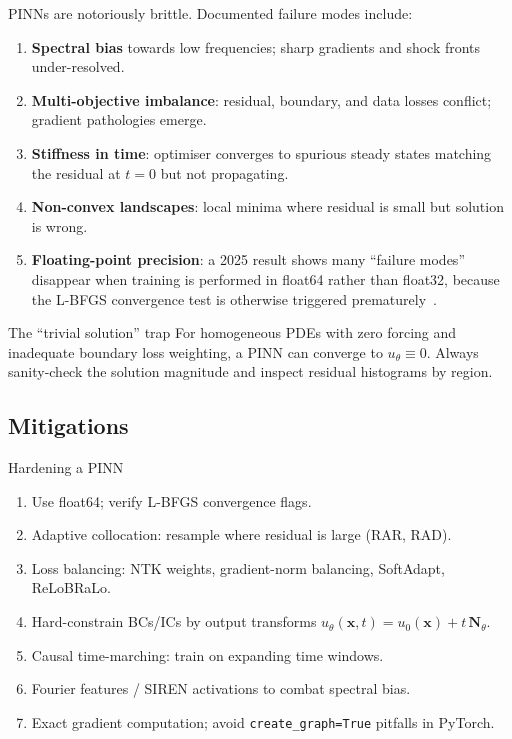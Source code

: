 PINNs are notoriously brittle. Documented failure modes include:
\begin{enumerate}
\item \textbf{Spectral bias} towards low frequencies; sharp gradients
and shock fronts under-resolved.
\item \textbf{Multi-objective imbalance}: residual, boundary, and data
losses conflict; gradient pathologies emerge.
\item \textbf{Stiffness in time}: optimiser converges to spurious steady
states matching the residual at $t=0$ but not propagating.
\item \textbf{Non-convex landscapes}: local minima where residual is
small but solution is wrong.
\item \textbf{Floating-point precision}: a 2025 result shows many
``failure modes'' disappear when training is performed in
\textsf{float64} rather than \textsf{float32}, because the L-BFGS
convergence test is otherwise triggered prematurely~\cite{rethinking2025pinn}.
\end{enumerate}

\begin{pitfall}{The ``trivial solution'' trap}
For homogeneous PDEs with zero forcing and inadequate boundary loss
weighting, a PINN can converge to $u_\theta\equiv 0$. Always sanity-check
the solution magnitude and inspect residual histograms by region.
\end{pitfall}

\subsection{Mitigations}
\begin{recipe}{Hardening a PINN}
\begin{enumerate}
\item Use \textsf{float64}; verify L-BFGS convergence flags.
\item Adaptive collocation: resample where residual is large (RAR,
RAD).
\item Loss balancing: NTK weights, gradient-norm balancing,
SoftAdapt, ReLoBRaLo.
\item Hard-constrain BCs/ICs by output transforms
$u_\theta(\bm{x},t) = u_0(\bm{x}) + t\,\bm{N}_\theta$.
\item Causal time-marching: train on expanding time windows.
\item Fourier features / SIREN activations to combat spectral bias.
\item Exact gradient computation; avoid \texttt{create\_graph=True}
pitfalls in PyTorch.
\end{enumerate}
\end{recipe}

